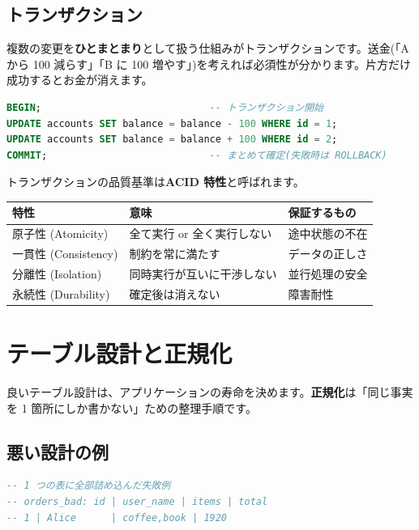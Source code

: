 \documentclass{article}
\begin{document}
\subsection{トランザクション}

複数の変更を\textbf{ひとまとまり}として扱う仕組みがトランザクションです。送金(「A から 100 減らす」「B に 100 増やす」)を考えれば必須性が分かります。片方だけ成功するとお金が消えます。

\begin{lstlisting}[language=SQL]
BEGIN;                             -- トランザクション開始
UPDATE accounts SET balance = balance - 100 WHERE id = 1;
UPDATE accounts SET balance = balance + 100 WHERE id = 2;
COMMIT;                            -- まとめて確定(失敗時は ROLLBACK)
\end{lstlisting}

トランザクションの品質基準は\textbf{ACID 特性}と呼ばれます。

\begin{center}
\begin{tabular}{|l|l|l|}
\hline
特性 & 意味 & 保証するもの \\
\hline
原子性 (Atomicity) & 全て実行 or 全く実行しない & 途中状態の不在 \\
一貫性 (Consistency) & 制約を常に満たす & データの正しさ \\
分離性 (Isolation) & 同時実行が互いに干渉しない & 並行処理の安全 \\
永続性 (Durability) & 確定後は消えない & 障害耐性 \\
\hline
\end{tabular}
\end{center}

\section{テーブル設計と正規化}

良いテーブル設計は、アプリケーションの寿命を決めます。\textbf{正規化}は「同じ事実を 1 箇所にしか書かない」ための整理手順です。

\subsection{悪い設計の例}

\begin{lstlisting}[language=SQL]
-- 1 つの表に全部詰め込んだ失敗例
-- orders_bad: id | user_name | items | total
-- 1 | Alice      | coffee,book | 1920
\end{lstlisting}
\end{document}
